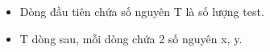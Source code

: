 \begin{itemize}
	\item     Dòng đầu tiên chứa số nguyên T là số lượng test.   
	\item     T dòng sau, mỗi dòng chứa 2 số nguyên x, y.   
\end{itemize}

\
